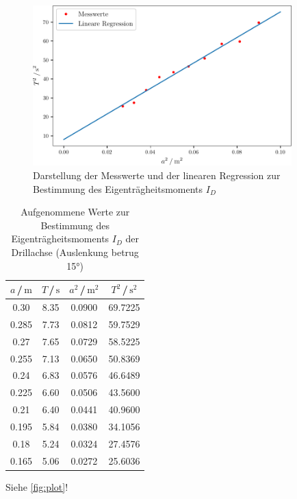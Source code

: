 \begin{figure}
    \centering
    \includegraphics[width=10cm]{build/plot.pdf}
    \caption{Darstellung der Messwerte und der linearen Regression zur Bestimmung des Eigenträgheitsmoments $I_D$}
\end{figure}




\begin{table}[H]
\normalsize

\centering
{}
\begin{tabular}{c c c c}
\toprule
    $a$\,/\,$\si{\meter}$ &  $T$\,/\,$\si{\second}$ & $a^2$\,/\,$\si{\meter}^2$ &  $T^2$\,/\,$\si{\second}^2$ \\
    \midrule

0.30  &   8.35 &  0.0900      & 69.7225\\
0.285 &   7.73 &  0.0812  & 59.7529\\
0.27  &   7.65 &  0.0729    & 58.5225\\
0.255 &   7.13 &  0.0650  & 50.8369\\
0.24  &   6.83 &  0.0576    & 46.6489\\
0.225 &   6.60 &  0.0506  & 43.5600\\
0.21  &   6.40 &  0.0441    & 40.9600\\
0.195 &   5.84 &  0.0380  & 34.1056\\
0.18  &   5.24 &  0.0324    & 27.4576\\
0.165 &   5.06 &  0.0272  & 25.6036\\ 

    \bottomrule
\end{tabular}
\caption{Aufgenommene Werte zur Bestimmung des Eigenträgheitsmoments $I_{D}$ der Drillachse (Auslenkung betrug 15°)}
\label{tab:a2}
\end{table}




Siehe \autoref{fig:plot}!
